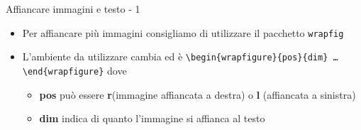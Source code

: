 \begin{frame}{Affiancare immagini e testo - 1}

\begin{itemize}
	\item Per affiancare più immagini consigliamo di utilizzare il pacchetto 
	\texttt{wrapfig}
	\item L'ambiente da utilizzare cambia ed è
	\texttt{\textbackslash{}begin\{wrapfigure\}\{pos\}\{dim\}
	\dots{}\textbackslash{}end\{wrapfigure\}} dove
	\begin{itemize}
		\item \textbf{pos} può essere \textbf{r}(immagine affiancata a destra)
		o \textbf{l} (affiancata a sinistra)
		\item \textbf{dim} indica di quanto l'immagine si affianca al testo
	\end{itemize}
\end{itemize}

\end{frame}
